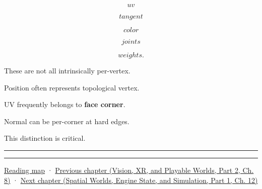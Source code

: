 \[
uv
\]

\[
tangent
\]

\[
color
\]

\[
joints
\]

\[
weights.
\]

These are not all intrinsically per-vertex.

Position often represents topological vertex.

UV frequently belongs to \textbf{face corner}.

Normal can be per-corner at hard edges.

This distinction is critical.

\begin{center}\rule{0.5\linewidth}{0.5pt}\end{center}

\begin{center}\rule{0.5\linewidth}{0.5pt}\end{center}

\hyperref[volume-reading-map]{Reading map} · \href{../07-Vision-XR-and-Playable-Worlds-P02/main.pdf\#nameddest=04-visual-computing-ii-ch039-tiling-ordering-and-compositing-at-scale}{Previous chapter (Vision, XR, and Playable Worlds, Part 2, Ch. 8)} · \href{../05-Spatial-Worlds-Engine-State-and-Simulation-P01/main.pdf\#nameddest=04-visual-computing-ii-ch041-per-vertex-and-per-corner-mesh-attributes}{Next chapter (Spatial Worlds, Engine State, and Simulation, Part 1, Ch. 12)}
